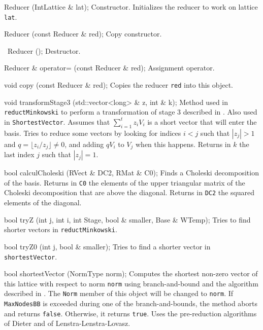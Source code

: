 {{   Reducer (IntLattice & lat);
\endcode
\tabb
Constructor. Initializes the reducer to work on lattice \texttt{lat}.
\endtabb
\code

   Reducer (const Reducer & red);
\endcode
\tabb
Copy constructor.
\endtabb
\code

   ~Reducer ();
\endcode
\tabb
Destructor.
\endtabb
\code

   Reducer & operator= (const Reducer & red);
\endcode
\tabb
Assignment operator.
\endtabb
\code

   void copy (const Reducer & red);
\endcode
\tabb
Copies the reducer \texttt{red} into this object. 
\endtabb
\code

   void transformStage3 (std::vector<long> & z, int & k);
\endcode
\tabb
  Method used in \texttt{reductMinkowski} to perform a transformation
  of stage 3 described in \cite{rAFF85a}. Also used in \texttt{ShortestVector}.
  Assumes that $\sum_{i=1}^t z_i V_i$ is a short vector that will enter
  the basis.  Tries to reduce some vectors by looking for indices $i < j$
  such that $|z_j| > 1$ and $q=\lfloor z_i/z_j\rfloor \not=0$,
  and adding $q V_i$ to $V_j$ when this happens.
  Returns in $k$ the last index $j$ such that $|z_j|=1$.
\endtabb
\code

   bool calculCholeski (RVect & DC2, RMat & C0);
\endcode
\tabb Finds a Choleski decomposition of the basis. Returns in \texttt{C0}
   the elements of the upper triangular matrix of the Choleski decomposition
   that are above the diagonal. Returns in \texttt{DC2} the
  squared elements of the diagonal. 
\endtabb
\code

   bool tryZ  (int j, int i, int Stage, bool & smaller, Base & WTemp);
\endcode
\tabb Tries to find shorter vectors in \texttt{reductMinkowski}.
\endtabb
\code

   bool tryZ0 (int j, bool & smaller);
\endcode
\tabb Tries to find a shorter vector in \texttt{shortestVector}.
\endtabb
\code

   bool shortestVector (NormType norm);
\endcode
\tabb
  Computes the shortest non-zero vector of this lattice with respect to norm
  \texttt{norm} using branch-and-bound and the algorithm described in
   \cite{rLEC97c}.
  The \texttt{Norm} member of this object  will be changed to \texttt{norm}.
   If \texttt{MaxNodesBB} is exceeded during {one} of the branch-and-bounds,
   the method aborts and returns \texttt{false}.
   Otherwise, it returns \texttt{true}. Uses the pre-reduction algorithms
   of Dieter and of Lenstra-Lenstra-Lovasz.
\endtabb
\code

}}
